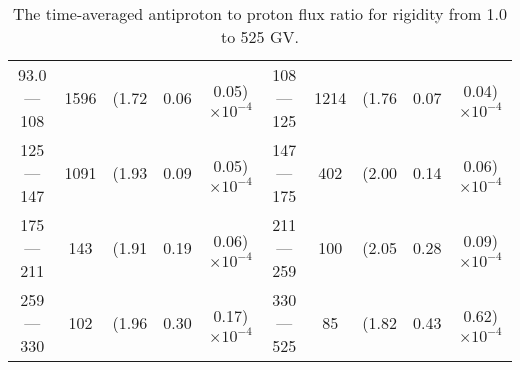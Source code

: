 \begin{table}[p]
\begin{tabular}{c|c|ccc  c|c|ccc}
93.0 — 108   &  1596                  &(1.72                                &  0.06                   &      0.05)$\times 10^{-4}$  & 108 — 125    &  1214                   &(1.76                                &  0.07                   &      0.04)$\times 10^{-4}$ \\
125 — 147    &  1091                  &(1.93                                &  0.09                   &      0.05)$\times 10^{-4}$  & 147 — 175    &  402                     &(2.00                                &  0.14                   &      0.06)$\times 10^{-4}$ \\
175 — 211    &  143                    &(1.91                                &  0.19                   &      0.06)$\times 10^{-4}$  & 211 — 259    &  100                     &(2.05                                &  0.28                   &      0.09)$\times 10^{-4}$ \\
259 — 330    &  102                    &(1.96                                &  0.30                   &      0.17)$\times 10^{-4}$  & 330 — 525    &  85                      &(1.82                                &  0.43                   &      0.62)$\times 10^{-4}$ \\
\hline
\end{tabular}
\caption{The time-averaged antiproton to proton flux ratio for rigidity from 1.0 to 525 GV.}
\label{TableOfAveragedResult}
\end{table}


\clearpage



